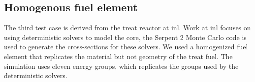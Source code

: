 \subsection{Homogenous fuel element}
\label{sec:homog}

The third test case is derived from the \gls{treat} reactor at
\gls{inl}. Work at \gls{inl} focuses on using deterministic solvers to
model the core, the Serpent 2 Monte Carlo code is used to generate the
cross-sections for these solvers. We used a homogenized fuel element
that replicates the material but not geometry of the \gls{treat}
fuel. The simulation uses eleven energy groups, which replicates the
groups used by the deterministic solvers.







